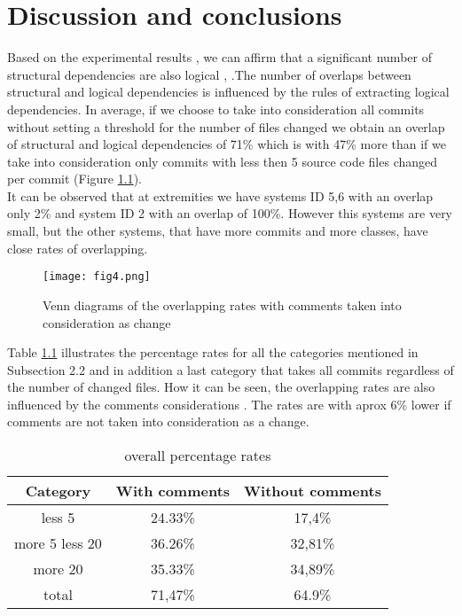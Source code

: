 \documentclass[12pt,a4paper,oneside]{report}
\begin{document}
\chapter{Discussion and conclusions}

Based on the experimental results , we can affirm that a significant number of structural dependencies are also logical \cite{ct10}, \cite{ct9}.The number of overlaps between structural and logical dependencies is influenced by the rules of extracting logical dependencies. In average, if we choose to take into consideration all commits without setting a threshold for the number of files changed we obtain an overlap of structural and logical dependencies of 71\% which is with 47\% more than if we take into consideration only commits with less then 5 source code files changed per commit (Figure \ref{fig:fig4}). \\ It can be observed that at extremities we have systems ID 5,6 with an overlap only 2\% and system ID 2 with an overlap of 100\%. However this systems are very small, but the other systems, that have more commits and more classes, have close rates of overlapping.
\begin{figure}[h]
\centering
\texttt{[image: fig4.png]}
\caption{Venn diagrams of the overlapping rates with comments taken into consideration as change}
\label{fig:fig4}
\end{figure}


Table \ref{table:7} illustrates the percentage rates for all the categories mentioned in Subsection 2.2 and in addition a last category that takes all commits regardless of the number of changed files. How it can be seen, the overlapping rates are also influenced by the comments considerations . The rates are with aprox 6\% lower if comments are not taken into consideration as a change. 


\begin{table}[h]
  \centering
  \begin{tabular}{@{}c||cc@{}}
    \toprule
       Category & With comments & Without comments  \\
    \midrule
less 5	&	24.33\% &	17,4\%	\\
more 5 less 20	&	36.26\% &	32,81\%\\
more 20	&	35.33\%	&	34,89\%\\
total & 71,47\% & 64.9\% \\
    \bottomrule
  \end{tabular}
  \caption{ overall percentage rates }
   \label{table:7}
\end{table}
\end{document}
